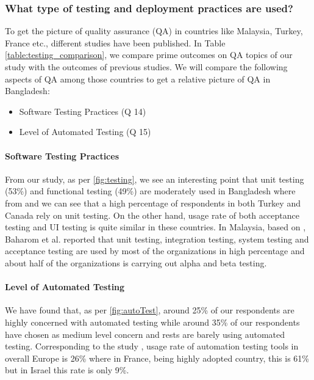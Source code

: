 \subsubsection{What type of testing and deployment practices are used?}

To get the picture of quality assurance (QA) in countries like Malaysia, Turkey, France etc., different studies have been published. In Table \ref{table:testing_comparison}, we compare prime outcomes on QA topics of our study with the outcomes of previous studies. We will compare the following aspects of QA among those countries to get a relative picture of QA in Bangladesh:

\begin{itemize}
    \item Software Testing Practices (Q 14)
    \item Level of Automated Testing (Q 15)
\end{itemize}




\paragraph{Software Testing Practices}
From our study, as per \ref{fig:testing}, we see an interesting point that unit testing (53\%) and functional testing (49\%) are moderately used in Bangladesh where from \cite{Wang2018} and \cite{Garousi2013} we can see that a high percentage of respondents in both Turkey and Canada rely on unit testing. On the other hand, usage rate of both acceptance testing and UI testing is quite similar in these countries. In Malaysia, based on \cite{Baharom2006}, Baharom et al. reported that unit testing, integration testing, system testing and acceptance testing are used by most of the organizations in high percentage and about half of the organizations is carrying out alpha and beta testing.



\paragraph{Level of Automated Testing}
We have found that, as per \ref{fig:autoTest}, around 25\% of our respondents are highly concerned with automated testing while around 35\% of our respondents have chosen as medium level concern and rests are barely using automated testing. Corresponding to the study \cite{dutta1999}, usage rate of automation testing tools in overall Europe is 26\% where in France, being highly adopted country, this is 61\% but in Israel this rate is only 9\%.
